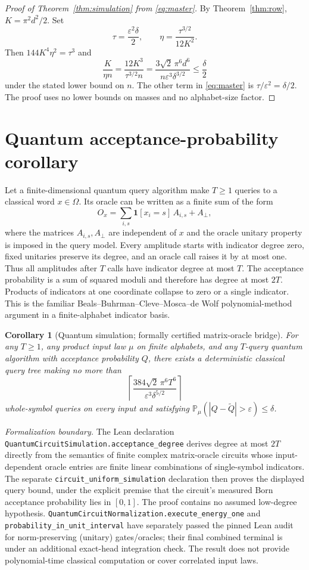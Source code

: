 \documentclass[11pt]{article}
\newtheorem{corollary}[theorem]{Corollary}
\newcommand{\Prb}{\mathbb P}
\newcommand{\one}{\mathbf 1}
\begin{document}
\begin{proof}[Proof of Theorem~\ref{thm:simulation} from \eqref{eq:master}]
By Theorem~\ref{thm:row}, $K=\pi^2d^2/2$. Set
\[
\tau=\frac{\varepsilon^2\delta}{2},
\qquad
\eta=\frac{\tau^{3/2}}{12K^2}.
\]
Then $144K^4\eta^2=\tau^3$ and
\[
\frac{K}{\eta n}=\frac{12K^3}{\tau^{3/2}n}
=\frac{3\sqrt2\,\pi^6d^6}{n\varepsilon^3\delta^{3/2}}
\le\frac{\delta}{2}
\]
under the stated lower bound on $n$. The other term in \eqref{eq:master} is $\tau/\varepsilon^2=\delta/2$. The proof uses no lower bounds on masses and no alphabet-size factor.
\end{proof}

\section{Quantum acceptance-probability corollary}
Let a finite-dimensional quantum query algorithm make $T\ge1$ queries to a classical word $x\in\Omega$. Its oracle can be written as a finite sum of the form
\[
O_x=\sum_{i,s}\one[x_i=s]\,A_{i,s}+A_\perp,
\]
where the matrices $A_{i,s},A_\perp$ are independent of $x$ and the oracle unitary property is imposed in the query model. Every amplitude starts with indicator degree zero, fixed unitaries preserve its degree, and an oracle call raises it by at most one. Thus all amplitudes after $T$ calls have indicator degree at most $T$. The acceptance probability is a sum of squared moduli and therefore has degree at most $2T$. Products of indicators at one coordinate collapse to zero or a single indicator. This is the familiar Beals--Buhrman--Cleve--Mosca--de Wolf polynomial-method argument \cite{Beals01} in a finite-alphabet indicator basis.

\begin{corollary}[Quantum simulation; formally certified matrix-oracle bridge]\label{cor:quantum}
For any $T\ge1$, any product input law $\mu$ on finite alphabets, and any $T$-query quantum algorithm with acceptance probability $Q$, there exists a deterministic classical query tree making no more than
\[
\left\lceil\frac{384\sqrt2\,\pi^6T^6}{\varepsilon^3\delta^{5/2}}\right\rceil
\]
whole-symbol queries on every input and satisfying
$\Prb_{\mu}(|Q-\widetilde Q|>\varepsilon)\le\delta$.
\end{corollary}

\emph{Formalization boundary.} The Lean declaration \texttt{QuantumCircuitSimulation.acceptance\_degree} derives degree at most $2T$ directly from the semantics of finite complex matrix-oracle circuits whose input-dependent oracle entries are finite linear combinations of single-symbol indicators. The separate \texttt{circuit\_uniform\_simulation} declaration then proves the displayed query bound, under the explicit premise that the circuit's measured Born acceptance probability lies in $[0,1]$. The proof contains no assumed low-degree hypothesis. \texttt{QuantumCircuitNormalization.execute\_energy\_one} and \texttt{probability\_in\_unit\_interval} have separately passed the pinned Lean audit for norm-preserving (unitary) gates/oracles; their final combined terminal is under an additional exact-head integration check. The result does not provide polynomial-time classical computation or cover correlated input laws.
\end{document}
